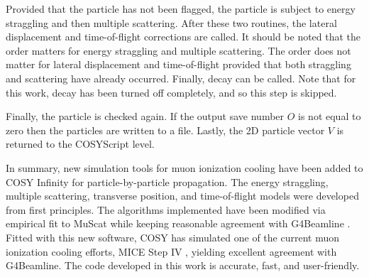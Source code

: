 Provided that the particle has not been flagged, the particle is subject to energy straggling and then multiple scattering. After these two routines, the lateral displacement and time-of-flight corrections are called. It should be noted that the order matters for energy straggling and multiple scattering. The order does not matter for lateral displacement and time-of-flight provided that both straggling and scattering have already occurred. Finally, decay can be called. Note that for this work, decay has been turned off completely, and so this step is skipped.

Finally, the particle is checked again. If the output save number $O$ is not equal to zero then the particles are written to a file. Lastly, the 2D particle vector $V$ is returned to the COSYScript level.

\label{sec:summary}

In summary, new simulation tools for muon ionization cooling have been added to COSY Infinity for particle-by-particle propagation. The energy straggling, multiple scattering, transverse position, and time-of-flight models were developed from first principles. The algorithms implemented have been modified via empirical fit to MuScat \cite{muscat} while keeping reasonable agreement with G4Beamline \cite{g4bl}. Fitted with this new software, COSY has simulated one of the current muon ionization cooling efforts, MICE Step IV \cite{mice}, yielding excellent agreement with G4Beamline. The code developed in this work is accurate, fast, and user-friendly.